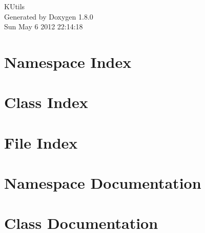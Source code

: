 \documentclass{book}
\begin{document}
\hypersetup{pageanchor=false,citecolor=blue}
\begin{titlepage}
\vspace*{7cm}
\begin{center}
{\Large K\-Utils }\\
\vspace*{1cm}
{\large Generated by Doxygen 1.8.0}\\
\vspace*{0.5cm}
{\small Sun May 6 2012 22:14:18}\\
\end{center}
\end{titlepage}
\clearemptydoublepage
{}
\tableofcontents
\clearemptydoublepage
{}
\hypersetup{pageanchor=true,citecolor=blue}
\chapter{Namespace Index}

\chapter{Class Index}

\chapter{File Index}

\chapter{Namespace Documentation}























\chapter{Class Documentation}

















\end{document}
